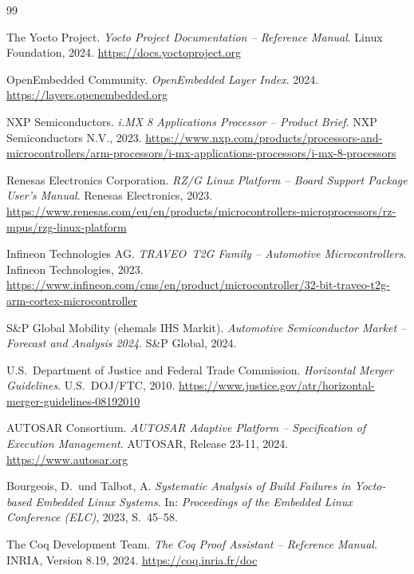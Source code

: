 ﻿\documentclass[a4paper,12pt]{article}
\theoremstyle{definition}
\begin{document}
\begin{thebibliography}{99}

The Yocto Project.
\textit{Yocto Project Documentation -- Reference Manual}.
Linux Foundation, 2024.
\url{https://docs.yoctoproject.org}

OpenEmbedded Community.
\textit{OpenEmbedded Layer Index}.
2024.
\url{https://layers.openembedded.org}

NXP Semiconductors.
\textit{i.MX 8 Applications Processor -- Product Brief}.
NXP Semiconductors N.V., 2023.
\url{https://www.nxp.com/products/processors-and-microcontrollers/arm-processors/i-mx-applications-processors/i-mx-8-processors}

Renesas Electronics Corporation.
\textit{RZ/G Linux Platform -- Board Support Package User's Manual}.
Renesas Electronics, 2023.
\url{https://www.renesas.com/eu/en/products/microcontrollers-microprocessors/rz-mpus/rzg-linux-platform}

Infineon Technologies AG.
\textit{TRAVEO\texttrademark\ T2G Family -- Automotive Microcontrollers}.
Infineon Technologies, 2023.
\url{https://www.infineon.com/cms/en/product/microcontroller/32-bit-traveo-t2g-arm-cortex-microcontroller}

S\&P Global Mobility (ehemals IHS Markit).
\textit{Automotive Semiconductor Market -- Forecast and Analysis 2024}.
S\&P Global, 2024.

U.S.\ Department of Justice and Federal Trade Commission.
\textit{Horizontal Merger Guidelines}.
U.S.\ DOJ/FTC, 2010.
\url{https://www.justice.gov/atr/horizontal-merger-guidelines-08192010}

AUTOSAR Consortium.
\textit{AUTOSAR Adaptive Platform -- Specification of Execution Management}.
AUTOSAR, Release 23-11, 2024.
\url{https://www.autosar.org}

Bourgeois, D.\ und Talbot, A.
\textit{Systematic Analysis of Build Failures in Yocto-based Embedded Linux Systems}.
In: \textit{Proceedings of the Embedded Linux Conference (ELC)}, 2023, S.\ 45--58.

The Coq Development Team.
\textit{The Coq Proof Assistant -- Reference Manual}.
INRIA, Version 8.19, 2024.
\url{https://coq.inria.fr/doc}


\end{thebibliography}
\end{document}

